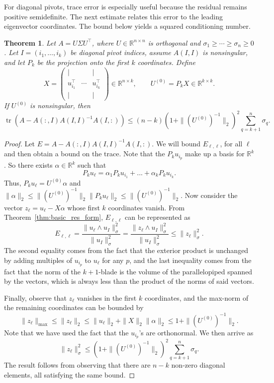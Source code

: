 \documentclass[11pt, preprint]{article}
\newtheorem{theorem}{Theorem}[section]
\newcommand{\R}{\mathbb{R}}
\begin{document}
For diagonal pivots, trace error is especially useful because the residual remains positive semidefinite. The next estimate relates this error to the leading eigenvector coordinates. The bound below yields a squared conditioning number. 

\begin{theorem} \label{thm:sym_res_trace}
Let $A=U\Sigma U^\top$, where $U\in\R^{n\times n}$ is orthogonal and
$\sigma_1\geq\cdots\geq\sigma_n\geq0$. Let
$I=(i_1,\ldots,i_k)$ be diagonal pivot indices, assume $A(I,I)$ is nonsingular, and let $P_k$ be the projection onto the first $k$ coordinates. Define
\[
X=
\begin{pmatrix}
|&&|\\
u_{i_1}^\top&\cdots&u_{i_k}^\top\\
|&&|
\end{pmatrix}\in\R^{n\times k},
\qquad
U^{(0)}=P_kX\in\R^{k\times k}.
\]
If $U^{(0)}$ is nonsingular, then
\begin{equation}\label{eq:psd-trace-bound}
\operatorname{tr}\!\left(A-A(:,I)A(I,I)^{-1}A(I,:)\right)
\leq
(n-k)\left(1+\|(U^{(0)})^{-1}\|_2\right)^2
\sum_{q=k+1}^n\sigma_q.
\end{equation}
\end{theorem}

 \begin{proof}
     Let $E=A-A(:,I)A(I,I)^{-1}A(I,:)$. We will bound $E_{\ell,\ell}$, for all $\ell$ and then obtain a bound on the trace. Note that the $P_k u_{i_p}$ make up a basis for $\R^k$. So there exists $\alpha\in\R^k$ such that 
     \[
     P_k u_{\ell} = \alpha_1 P_k u_{i_1} + ... + \alpha_k P_k u_{i_k}.
     \]
      Thus, $P_k u_\ell = U^{(0)} \alpha$ and $\|\alpha\|_2 \leq \|(U^{(0)})^{-1}\|_2 \|P_k u_\ell\|_2 \leq \|(U^{(0)})^{-1}\|_2$. Now consider the vector $z_\ell = u_\ell - X\alpha$ whose first $k$ coordinates vanish. From Theorem~\ref{thm:basic_res_form}, $E_{\ell,\ell}$ can be represented as 
      \[
     E_{\ell,\ell} = \frac{\|u_\ell\wedge u_I\|_\sigma^2}{\|u_I\|_\sigma^2} = \frac{\|z_{\ell}\wedge u_I\|_\sigma^2}{\|u_I\|_\sigma^2}\leq \|z_\ell\|_\sigma^2.
     \]
     The second equality comes from the fact that the exterior product is unchanged by adding multiples of $u_{i_p}$ to $u_\ell$ for any $p$, and the last inequality comes from the fact that the norm of the $k+1$-blade is the volume of the parallelopiped spanned by the vectors, which is always less than the product of the norms of said vectors. 

     Finally, observe that $z_\ell$ vanishes in the first $k$ coordinates, and the max-norm of the remaining coordinates can be bounded by \[
     \|z_\ell\|_{\text{max}} \leq \|z_\ell\|_2 \leq \|u_\ell\|_2 + \|X\|_2\|\alpha\|_2 \leq 1 + \|(U^{(0)})^{-1}\|_2.
     \]
     Note that we have used the fact that the $u_{i_p}$'s are orthonormal. We then arrive as \[
     \|z_\ell\|_\sigma^2 \leq (1 + \|(U^{(0)})^{-1}\|_2)^2\sum_{q=k+1}^n\sigma_q.
     \]
     The result follows from observing that there are $n-k$ non-zero diagonal elements, all satisfying the same bound. 
 \end{proof}
\end{document}
